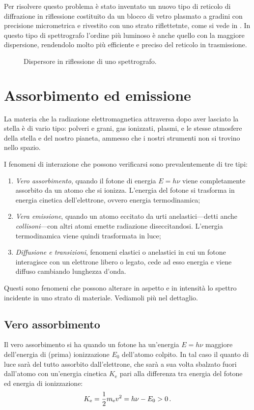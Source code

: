     Per risolvere questo problema è stato inventato un nuovo tipo di reticolo di diffrazione in riflessione costituito da un blocco di vetro plasmato a gradini con precisione micrometrica e rivestito con uno strato riflettetnte, come si vede in . In questo tipo di spettrografo l'ordine più luminoso è anche quello con la maggiore dispersione, rendendolo molto più efficiente e preciso del reticolo in trasmissione.
    \begin{figure}
        \centering
        \caption{Dispersore in riflessione di uno spettrografo.}
        \label{fig:grating-spectrographer}
    \end{figure}

\section{Assorbimento ed emissione}
    La materia che la radiazione elettromagnetica attraversa dopo aver lasciato la stella è di vario tipo: polveri e grani, gas ionizzati, plasmi, e le stesse atmosfere della stella e del nostro pianeta, ammesso che i nostri strumenti non si trovino nello spazio.

    I fenomeni di interazione che possono verificarsi sono prevalentemente di tre tipi:
    \begin{enumerate}[label=\ding{70}]
        \item \emph{Vero assorbimento}, quando il fotone di energia $E = h\nu$ viene completamente assorbito da un atomo che si ionizza. L'energia del fotone si trasforma in energia cinetica dell'elettrone, ovvero energia termodinamica;
        \item \emph{Vera emissione}, quando un atomo eccitato da urti anelastici---detti anche \emph{collisoni}---con altri atomi emette radiazione diseccitandosi. L'energia termodinamica viene quindi trasformata in luce;
        \item \emph{Diffusione e transizioni}, fenomeni elastici o anelastici in cui un fotone interagisce con un elettrone libero o legato, cede ad esso energia e viene diffuso cambiando lunghezza d'onda.
    \end{enumerate}
    Questi sono fenomeni che possono alterare in aspetto e in intensità lo spettro incidente in uno strato di materiale. Vediamoli più nel dettaglio.
    \subsection{Vero assorbimento}
        Il vero assorbimento si ha quando un fotone ha un'energia $E = h\nu$ maggiore dell'energia di (prima) ionizzazione $E_0$ dell'atomo colpito. In tal caso il quanto di luce sarà del tutto assorbito dall'elettrone, che sarà a sua volta sbalzato fuori dall'atomo con un'energia cinetica $K_\text{e}$ pari alla differenza tra energia del fotone ed energia di ionizzazione:
        \begin{equation*}
            K_\text{e} = \frac{1}{2} m_\text{e} v^2 = h\nu - E_0 > 0
            \,.
        \end{equation*}
        
